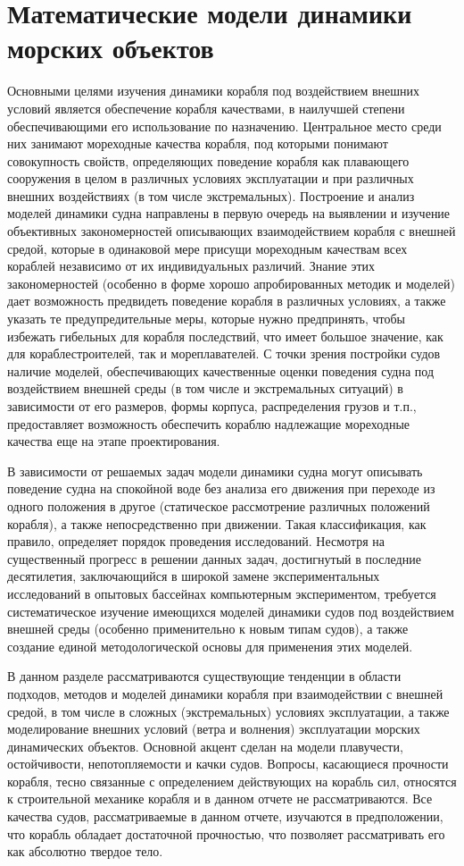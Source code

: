 \section{Математические модели динамики морских объектов}

Основными целями изучения динамики корабля под воздействием внешних условий является обеспечение корабля качествами, в наилучшей степени обеспечивающими его использование по назначению. Центральное место среди них занимают мореходные качества корабля, под которыми понимают совокупность свойств, определяющих поведение корабля как плавающего сооружения в целом в различных условиях эксплуатации и при различных внешних воздействиях (в том числе экстремальных). Построение и анализ моделей динамики судна направлены в первую очередь на выявлении и изучение объективных закономерностей описывающих взаимодействием корабля с внешней средой, которые в одинаковой мере присущи мореходным качествам всех кораблей независимо от их индивидуальных различий. Знание этих закономерностей (особенно в форме хорошо апробированных методик и моделей) дает возможность предвидеть поведение корабля в различных условиях, а также указать те предупредительные меры, которые нужно предпринять, чтобы избежать гибельных для корабля последствий, что имеет большое значение, как для кораблестроителей, так и мореплавателей. С точки зрения постройки судов наличие моделей, обеспечивающих качественные оценки поведения судна под воздействием внешней среды (в том числе и экстремальных ситуаций) в зависимости от его размеров, формы корпуса, распределения грузов и т.п., предоставляет возможность обеспечить кораблю надлежащие мореходные качества еще  на этапе проектирования.

В зависимости от решаемых задач модели динамики судна могут описывать поведение судна на спокойной воде без анализа его движения при переходе из одного положения в другое (статическое рассмотрение различных положений корабля), а также непосредственно при движении. Такая классификация, как правило, определяет порядок проведения исследований. Несмотря на существенный прогресс в решении данных задач, достигнутый в последние десятилетия, заключающийся в широкой замене экспериментальных исследований в опытовых бассейнах компьютерным экспериментом, требуется систематическое изучение имеющихся моделей динамики судов под воздействием внешней среды (особенно применительно к новым типам судов), а также создание единой методологической основы для применения этих моделей.

В данном разделе рассматриваются существующие тенденции в области подходов, методов и моделей динамики корабля при взаимодействии с внешней средой, в том числе в сложных (экстремальных) условиях эксплуатации, а также моделирование внешних условий (ветра и волнения) эксплуатации морских динамических объектов. Основной акцент сделан на модели плавучести, остойчивости, непотопляемости и качки судов. Вопросы, касающиеся прочности корабля, тесно связанные с определением действующих на корабль сил, относятся к строительной механике корабля и в данном отчете не рассматриваются. Все качества судов, рассматриваемые в данном отчете, изучаются в предположении, что корабль обладает достаточной прочностью, что позволяет рассматривать его как абсолютно твердое тело.

